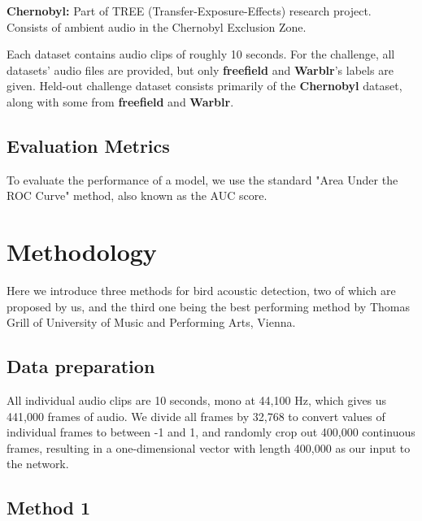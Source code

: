 \documentclass[10pt,twocolumn,letterpaper]{article}
\begin{document}
\textbf{Chernobyl:} Part of TREE (Transfer-Exposure-Effects) research
project. Consists of ambient audio in the Chernobyl Exclusion Zone. 

Each dataset contains audio clips of roughly 10 seconds. For the challenge,
all datasets' audio files are provided, but only \textbf{freefield} and
\textbf{Warblr}'s labels are given. Held-out challenge dataset consists
primarily of the \textbf{Chernobyl} dataset, along with some from
\textbf{freefield} and \textbf{Warblr}.

\subsection{Evaluation Metrics}

To evaluate the performance of a model, we use the standard "Area Under the
ROC Curve" method, also known as the AUC score.

\section{Methodology}

Here we introduce three methods for bird acoustic detection, two of which
are proposed by us, and the third one being the best performing method by
Thomas Grill of University of Music and Performing Arts, Vienna. 

\subsection{Data preparation}

All individual audio clips are 10 seconds, mono at 44,100 Hz, which gives us
441,000 frames of audio. We divide all frames by 32,768 to convert values of
individual frames to between -1 and 1, and randomly crop out 400,000
continuous frames, resulting in a one-dimensional vector with length 400,000
as our input to the network.

\subsection{Method 1}

\end{document}
